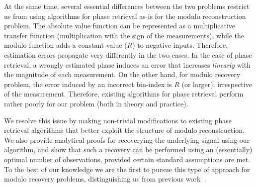 At the same time, several essential differences between the two problems restrict us from using algorithms for phase retrieval as-is for the modulo reconstruction problem. The absolute value function can be represented as a multiplicative transfer function (multiplication with the sign of the measurements), while the modulo function adds a constant value ($R$) to negative inputs. %
Therefore, estimation errors propagate very differently in the two cases. In the case of phase retrieval, a wrongly estimated phase induces an error that increases \emph{linearly} with the magnitude of each measurement. %
On the other hand, for modulo recovery problem, the error induced by an incorrect bin-index is $R$ (or larger), irrespective of the measurement. Therefore, existing algorithms for phase retrieval perform rather poorly for our problem (both in theory and practice). %

We resolve this issue by making non-trivial modifications to existing phase retrieval algorithms that better exploit the structure of modulo reconstruction. We also provide analytical proofs for recoverying the underlying signal using our algorithm, and show that such a recovery can be performed using an (essentially) optimal number of observations, provided certain standard assumptions are met. To the best of our knowledge we are the first to pursue this type of approach for modulo recovery problems, distinguishing us from previous work~\cite{Zhao2015,Bhandari}. 

